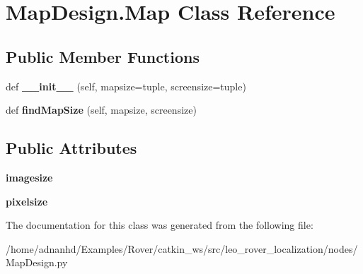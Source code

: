 \hypertarget{classMapDesign_1_1Map}{}\section{Map\+Design.\+Map Class Reference}
\label{classMapDesign_1_1Map}
\subsection*{Public Member Functions}
\begin{DoxyCompactItemize}
\item 
\mbox{\label{classMapDesign_1_1Map_a4857633ee3e8709f1b2712f06f244b93}} 
def {\bfseries \+\_\+\+\_\+init\+\_\+\+\_\+} (self, mapsize=tuple, screensize=tuple)
\item 
\mbox{\label{classMapDesign_1_1Map_ac46bd07ecbf51504b15153782e79c829}} 
def {\bfseries find\+Map\+Size} (self, mapsize, screensize)
\end{DoxyCompactItemize}
\subsection*{Public Attributes}
\begin{DoxyCompactItemize}
\item 
\mbox{\label{classMapDesign_1_1Map_a677032aa422a2151a2e8a3a3eb57eb25}} 
{\bfseries imagesize}
\item 
\mbox{\label{classMapDesign_1_1Map_a322565c2c24bb43f8f945d0ee3f06e2a}} 
{\bfseries pixelsize}
\end{DoxyCompactItemize}


The documentation for this class was generated from the following file\+:\begin{DoxyCompactItemize}
\item 
/home/adnanhd/\+Examples/\+Rover/catkin\+\_\+ws/src/leo\+\_\+rover\+\_\+localization/nodes/Map\+Design.\+py\end{DoxyCompactItemize}
